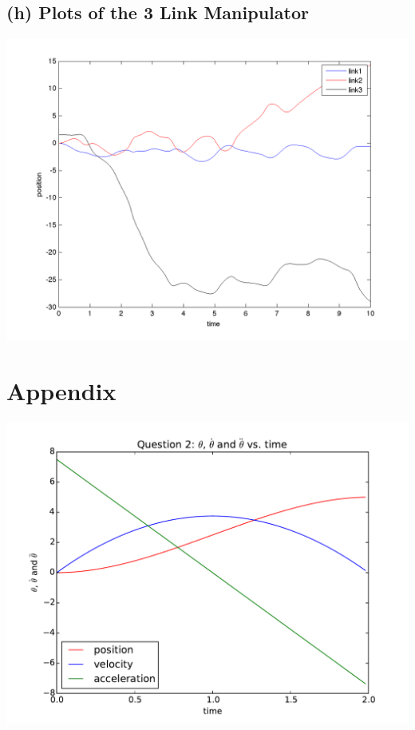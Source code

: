 \documentclass[10pt]{article}
\begin{document}
\subsection{(h) Plots of the 3 Link Manipulator}
\begin{center}
\includegraphics[scale=0.5]{hw10_4.png}
\end{center}

\section{Appendix}
\begin{center}
\includegraphics[scale=0.5]{homework10plots.pdf}
\end{center}
\end{document}
